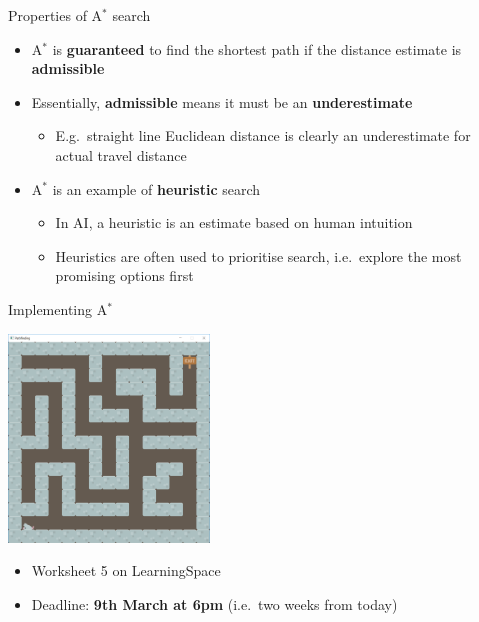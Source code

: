 \begin{frame}{Properties of A$^*$ search}
    \begin{itemize}
        \item A$^*$ is \textbf{guaranteed} to find the shortest path
            if the distance estimate is \textbf{admissible} \pause
        \item Essentially, \textbf{admissible} means it must be an \textbf{underestimate} \pause
            \begin{itemize}
                \item E.g.\ straight line Euclidean distance is clearly an underestimate
                    for actual travel distance \pause
            \end{itemize}
        \item A$^*$ is an example of \textbf{heuristic} search \pause
            \begin{itemize}
                \item In AI, a heuristic is an estimate based on human intuition \pause
                \item Heuristics are often used to prioritise search,
                    i.e.\ explore the most promising options first
            \end{itemize}
    \end{itemize}
\end{frame}

\begin{frame}{Implementing A$^*$}
    \begin{center}
        \includegraphics[width=0.4\textwidth]{application}
    \end{center}
    \begin{itemize}
        \item Worksheet 5 on LearningSpace
        \item Deadline: \textbf{9th March at 6pm} (i.e.\ two weeks from today)
    \end{itemize}
\end{frame}

